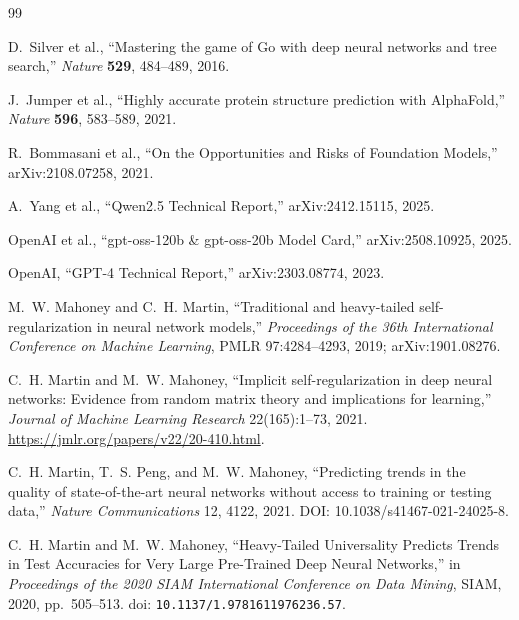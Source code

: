 \documentclass[10pt,twocolumn]{article}
\begin{document}
\clearpage
\begin{thebibliography}{99}
\footnotesize\setlength{\itemsep}{0pt}\setlength{\parskip}{0pt}


D.~Silver et al.,
``Mastering the game of Go with deep neural networks and tree search,''
\emph{Nature} \textbf{529}, 484--489, 2016.

J.~Jumper et al.,
``Highly accurate protein structure prediction with AlphaFold,''
\emph{Nature} \textbf{596}, 583--589, 2021.

R.~Bommasani et al.,
``On the Opportunities and Risks of Foundation Models,''
arXiv:2108.07258, 2021.

A.~Yang et al.,
``Qwen2.5 Technical Report,''
arXiv:2412.15115, 2025.

OpenAI et al.,
``gpt-oss-120b \& gpt-oss-20b Model Card,''
arXiv:2508.10925, 2025.

OpenAI,
``GPT-4 Technical Report,''
arXiv:2303.08774, 2023.


M.~W. Mahoney and C.~H. Martin, ``Traditional and heavy-tailed self-regularization in neural network models,'' \emph{Proceedings of the 36th International Conference on Machine Learning}, PMLR 97:4284--4293, 2019; arXiv:1901.08276.

C.~H. Martin and M.~W. Mahoney, ``Implicit self-regularization in deep neural networks: Evidence from random matrix theory and implications for learning,'' \emph{Journal of Machine Learning Research} 22(165):1--73, 2021. \url{https://jmlr.org/papers/v22/20-410.html}.

  C.~H. Martin, T.~S. Peng, and M.~W. Mahoney, ``Predicting trends in the quality of state-of-the-art neural networks without access to training or testing data,'' \emph{Nature Communications} 12, 4122, 2021. DOI: 10.1038/s41467-021-24025-8.

C.~H. Martin and M.~W. Mahoney,
``Heavy-Tailed Universality Predicts Trends in Test Accuracies for Very Large Pre-Trained Deep Neural Networks,''
in \emph{Proceedings of the 2020 SIAM International Conference on Data Mining},
SIAM, 2020, pp.~505--513.
doi: \texttt{10.1137/1.9781611976236.57}.


\end{thebibliography}
\end{document}
